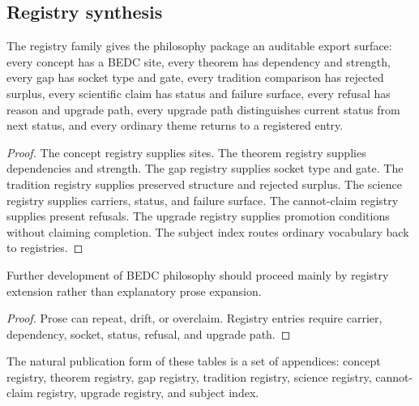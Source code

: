 \subsection{Registry synthesis}
\label{subsec:philosophy-registry-synthesis}

\begin{theorem}
\label{thm:philosophy-registry-synthesis}
The registry family gives the philosophy package an auditable export
surface: every concept has a BEDC site, every theorem has dependency
and strength, every gap has socket type and gate, every tradition
comparison has rejected surplus, every scientific claim has status and
failure surface, every refusal has reason and upgrade path, every
upgrade path distinguishes current status from next status, and every
ordinary theme returns to a registered entry.
\end{theorem}
\begin{proof}
The concept registry supplies sites. The theorem registry supplies
dependencies and strength. The gap registry supplies socket type and
gate. The tradition registry supplies preserved structure and rejected
surplus. The science registry supplies carriers, status, and failure
surface. The cannot-claim registry supplies present refusals. The
upgrade registry supplies promotion conditions without claiming
completion. The subject index routes ordinary vocabulary back to
registries.
\end{proof}


\begin{corollary}
\label{cor:philosophy-registries-replace-prose-expansion}
Further development of BEDC philosophy should proceed mainly by
registry extension rather than explanatory prose expansion.
\end{corollary}
\begin{proof}
Prose can repeat, drift, or overclaim. Registry entries require
carrier, dependency, socket, status, refusal, and upgrade path.
\end{proof}

\begin{corollary}
\label{cor:philosophy-registry-appendix-route}
The natural publication form of these tables is a set of appendices:
concept registry, theorem registry, gap registry, tradition registry,
science registry, cannot-claim registry, upgrade registry, and subject
index.
\end{corollary}

